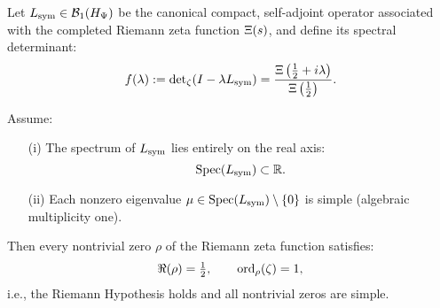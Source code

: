\begin{proposition}
\label{prop:spectrum_reality_implies_rh_multiplicity}

Let \( L_{\mathrm{sym}} \in \mathcal{B}_1(H_{\Psi}) \) be the canonical compact, self-adjoint operator associated with the completed Riemann zeta function \( \Xi(s) \), and define its spectral determinant:
\[
f(\lambda) := \det\nolimits_\zeta(I - \lambda L_{\mathrm{sym}}) = \frac{\Xi\left( \tfrac{1}{2} + i\lambda \right)}{\Xi\left( \tfrac{1}{2} \right)}.
\]

Assume:
\begin{enumerate}
  \item[\textup{(i)}] The spectrum of \( L_{\mathrm{sym}} \) lies entirely on the real axis:
  \[
  \operatorname{Spec}(L_{\mathrm{sym}}) \subset \mathbb{R}.
  \]

  \item[\textup{(ii)}] Each nonzero eigenvalue \( \mu \in \operatorname{Spec}(L_{\mathrm{sym}}) \setminus \{0\} \) is simple (algebraic multiplicity one).
\end{enumerate}

Then every nontrivial zero \( \rho \) of the Riemann zeta function satisfies:
\[
\Re(\rho) = \tfrac{1}{2}, \qquad \operatorname{ord}_\rho(\zeta) = 1,
\]
i.e., the Riemann Hypothesis holds and all nontrivial zeros are simple.
\end{proposition}
